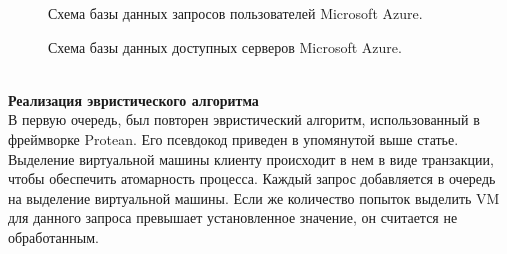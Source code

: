 \documentclass{article}
\begin{document}
\begin{figure}[h]
\caption{Схема базы данных запросов пользователей Microsoft Azure\cite{litlink22}.}
\label{ris:image}
\end{figure}
\begin{figure}[h]
\caption{Схема базы данных доступных серверов Microsoft Azure\cite{litlink22}.}
\label{ris:image}
\end{figure}\\
\textbf{Реализация эвристического алгоритма}\\
В первую очередь, был повторен эвристический алгоритм, использованный в фреймворке Protean. Его псевдокод приведен в упомянутой выше статье. Выделение виртуальной машины клиенту происходит в нем в виде транзакции, чтобы обеспечить атомарность процесса. Каждый запрос добавляется в очередь на выделение виртуальной машины. Если же количество попыток выделить VM для данного запроса превышает установленное значение, он считается не обработанным.\\
\end{document}
